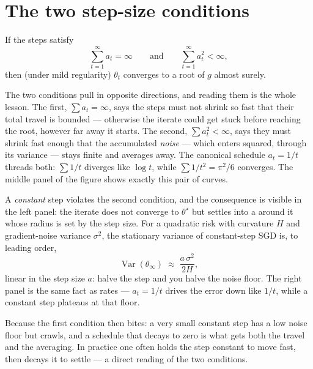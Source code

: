\documentclass[11pt]{article}
\begin{document}
\section{The two step-size conditions}

\begin{theorem}
If the steps satisfy
\[
  \sum_{t=1}^\infty a_t = \infty \qquad\text{and}\qquad \sum_{t=1}^\infty a_t^2 < \infty,
\]
then (under mild regularity) $\theta_t$ converges to a root of $g$ almost surely.
\end{theorem}

The two conditions pull in opposite directions, and reading them is the whole
lesson. The first, $\sum a_t=\infty$, says the steps must not shrink so fast
that their total travel is bounded --- otherwise the iterate could get stuck
before reaching the root, however far away it starts. The second,
$\sum a_t^2<\infty$, says they must shrink fast enough that the accumulated
\emph{noise} --- which enters squared, through its variance --- stays finite and
averages away. The canonical schedule $a_t=1/t$ threads both: $\sum 1/t$
diverges like $\log t$, while $\sum 1/t^2 = \pi^2/6$ converges. The middle panel
of the figure shows exactly this pair of curves.

A \emph{constant} step violates the second condition, and the consequence is
visible in the left panel: the iterate does not converge to $\theta^\star$ but
settles into a  around it whose radius is set by the step
size. For a quadratic risk with curvature $H$ and gradient-noise variance
$\sigma^2$, the stationary variance of constant-step SGD is, to leading order,
\[
  \operatorname{Var}(\theta_\infty) \;\approx\; \frac{a\,\sigma^2}{2H},
\]
linear in the step size $a$: halve the step and you halve the noise floor. The
right panel is the same fact as rates --- $a_t=1/t$ drives the error down like
$1/t$, while a constant step plateaus at that floor.

\begin{example}
Because the first condition then bites: a very small constant step has a low
noise floor but crawls, and a schedule that decays to zero is what gets both the
travel and the averaging. In practice one often holds the step constant to move
fast, then decays it to settle --- a direct reading of the two conditions.
\end{example}
\end{document}
